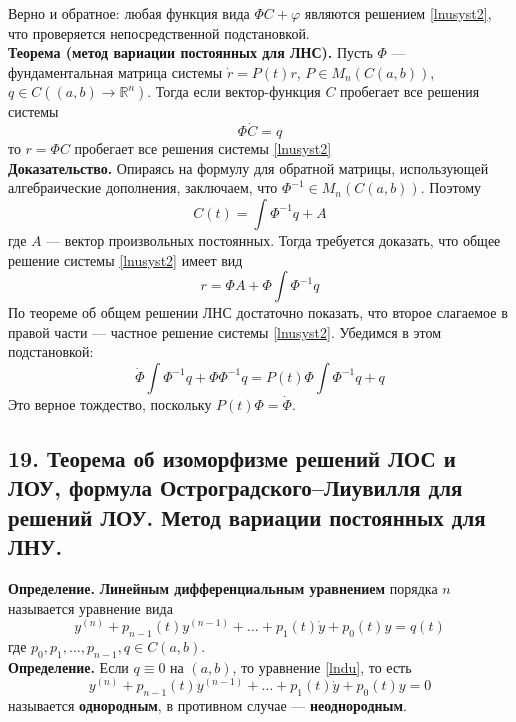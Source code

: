 Верно и обратное: любая функция вида $\Phi C + \varphi$ являются решением \eqref{lnusyst2}, что проверяется непосредственной подстановкой.\\

\noindent \textbf{Теорема (метод вариации постоянных для ЛНС).} Пусть $\Phi$ --- фундаментальная матрица системы $\dot{r} = P(t)r$, $P \in M_n(C(a,b))$, $q \in C((a,b) \to \mathbb{R}^n)$. Тогда если вектор-функция $C$ пробегает все решения системы
\begin{equation*}
    \Phi\dot{C} = q
\end{equation*}
то $r = \Phi C$ пробегает все решения системы \eqref{lnusyst2}\\

\noindent \textbf{Доказательство.} Опираясь на формулу для обратной матрицы, использующей алгебраические дополнения, заключаем, что $\Phi^{-1} \in M_n(C(a,b))$. Поэтому
\begin{equation*}
    C(t) = \int \Phi^{-1}q + A
\end{equation*}
где $A$ --- вектор произвольных постоянных. Тогда требуется доказать, что общее решение системы \eqref{lnusyst2} имеет вид
\begin{equation*}
    r = \Phi A + \Phi \int \Phi^{-1}q
\end{equation*}
По теореме об общем решении ЛНС достаточно показать, что второе слагаемое в правой части --- частное решение системы \eqref{lnusyst2}. Убедимся в этом подстановкой:
\begin{equation*}
    \dot{\Phi}\int \Phi^{-1}q + \Phi\Phi^{-1}q = P(t)\Phi \int \Phi^{-1}q + q
\end{equation*}
Это верное тождество, поскольку $P(t)\Phi = \dot{\Phi}$.

\subsection*{19. Теорема об изоморфизме решений ЛОС и ЛОУ, формула Остроградского–Лиувилля для решений ЛОУ. Метод вариации постоянных для ЛНУ.}

\textbf{Определение.} \textbf{Линейным дифференциальным уравнением} порядка $n$ называется уравнение вида
\begin{equation}
    y^{(n)} + p_{n-1}(t)y^{(n - 1)} + \ldots + p_1(t)\dot{y} + p_0(t)y = q(t) \label{lndu}
\end{equation}
где $p_0, p_1, \ldots, p_{n-1}, q \in C(a,b)$.\\

\noindent \textbf{Определение.} Если $q \equiv 0$ на $(a,b)$, то уравнение \eqref{lndu}, то есть
\begin{equation}
    y^{(n)} + p_{n-1}(t)y^{(n - 1)} + \ldots + p_1(t)\dot{y} + p_0(t)y = 0 \label{lnou}
\end{equation}
называется \textbf{однородным}, в противном случае --- \textbf{неоднородным}.\\

